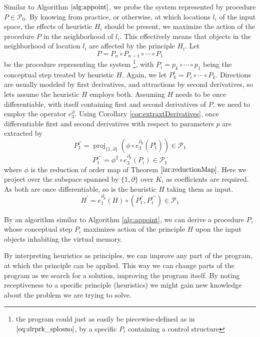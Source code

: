 \documentclass[preprint,12pt]{elsarticle}
\newcommand{\dP}{\mathcal{P}}
\newcommand{\D}{\partial}
\DeclareMathOperator{\proj}{proj}
\begin{document}
Similar to Algorithm $\ref{alg:appoint}$, we probe the system represented by procedure $P\in\dP_0$. By knowing from practice, or otherwise, at which locations $l_i$ of the input space, the effects of heuristic $H_i$ should be present, we maximize the action of the procedure $P$ in the neighborhood of $l_i$. This effectively means that objects in the neighborhood of location $l_i$ are affected by the principle $H_i$.
Let
\begin{equation}
P=P_n\circ P_{n-1}\circ\cdots\circ P_1
\end{equation}
be the procedure representing the system \footnote{the program could just as easily be piecewise-defined as in $\eqref{eq:zlrprk_splosno}$, by a specific $P_i$ containing a control structure}, with $P_i=p_k\circ\cdots\circ p_1$ being the conceptual step treated by heuristic $H$. Again, we let $P^i_k=P_i\circ\cdots\circ P_k$. Directions are usually modeled by first derivatives, and attractions by second derivatives, so lets assume the heuristic $H$ employs both. 
Assuming $H$ needs to be once differentiable, with itself containing first and second derivatives of $P$, we need to employ the operator $e^\D_3$. Using Corollary \ref{cor:extraxtDerivatives}, once differentiable first and second derivatives with respect to parameters $p$ are extracted by
\begin{equation}
P^{i\prime}_1=\proj_{\{1,\D\}}\left(\phi\circ e^{\D_{p}}_3(P^i_1)\right)\in\dP_1
\end{equation}
\begin{equation}
P^{i\prime\prime}_1=\phi^2\circ e^{\D_p}_3(P_i)\in\dP_1
\end{equation}
where $\phi$ is the reduction of order map of Theorem $\ref{izr:reductionMap}$. Here we project over the subspace spanned by $\{1,\D\}$ over $K$, as coefficients are required. As both are once differentiable, so is the heuristic $H$ taking them as input.
\begin{equation}
H^\prime=e^{\D_p}_1(H)\circ(P^{i\prime}_1,P^{i\prime\prime}_1)\in\dP_1
\end{equation}

By an algorithm similar to Algorithm \ref{alg:appoint}, we can derive a procedure $P$, whose conceptual step $P_i$ maximizes action of the principle $H$ upon the input objects inhabiting the virtual memory.

By interpreting heuristics as principles, we can improve any part of the program, at which the principle can be applied. This way we can change parts of the program as we search for a solution, improving the program itself. By noting receptiveness to a specific principle (heuristics) we might gain new knowledge about the problem we are trying to solve.
\end{document}
